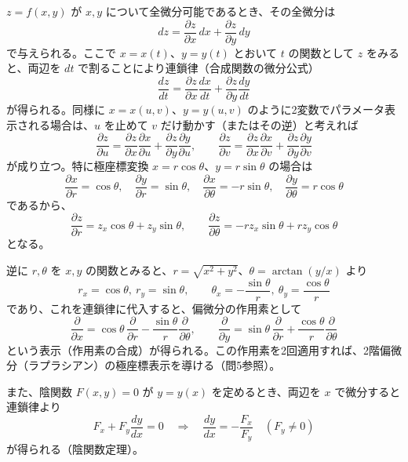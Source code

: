 \documentclass[a4paper,11pt]{article}
\begin{document}


\noindent
$z = f(x,y)$ が $x,y$ について全微分可能であるとき、その全微分は
\[
dz = \frac{\partial z}{\partial x}\,dx + \frac{\partial z}{\partial y}\,dy
\]
で与えられる。ここで $x = x(t)$、$y = y(t)$ とおいて $t$ の関数として $z$ をみると、両辺を $dt$ で割ることにより連鎖律（合成関数の微分公式）
\[
\frac{dz}{dt} = \frac{\partial z}{\partial x}\frac{dx}{dt} + \frac{\partial z}{\partial y}\frac{dy}{dt}
\]
が得られる。同様に $x = x(u,v)$、$y = y(u,v)$ のように2変数でパラメータ表示される場合は、$u$ を止めて $v$ だけ動かす（またはその逆）と考えれば
\[
\frac{\partial z}{\partial u} = \frac{\partial z}{\partial x}\frac{\partial x}{\partial u} + \frac{\partial z}{\partial y}\frac{\partial y}{\partial u}, \qquad
\frac{\partial z}{\partial v} = \frac{\partial z}{\partial x}\frac{\partial x}{\partial v} + \frac{\partial z}{\partial y}\frac{\partial y}{\partial v}
\]
が成り立つ。特に極座標変換 $x = r\cos\theta$、$y = r\sin\theta$ の場合は
\[
\frac{\partial x}{\partial r} = \cos\theta,\quad \frac{\partial y}{\partial r} = \sin\theta,\quad
\frac{\partial x}{\partial \theta} = -r\sin\theta,\quad \frac{\partial y}{\partial \theta} = r\cos\theta
\]
であるから、
\[
\frac{\partial z}{\partial r} = z_{x}\cos\theta + z_{y}\sin\theta, \qquad
\frac{\partial z}{\partial \theta} = -r z_{x}\sin\theta + r z_{y}\cos\theta
\]
となる。

逆に $r,\theta$ を $x,y$ の関数とみると、$r = \sqrt{x^{2}+y^{2}}$、$\theta = \arctan(y/x)$ より
\[
r_{x} = \cos\theta,\ r_{y} = \sin\theta,\qquad
\theta_{x} = -\frac{\sin\theta}{r},\ \theta_{y} = \frac{\cos\theta}{r}
\]
であり、これを連鎖律に代入すると、偏微分の作用素として
\[
\frac{\partial}{\partial x} = \cos\theta\,\frac{\partial}{\partial r} - \frac{\sin\theta}{r}\frac{\partial}{\partial \theta}, \qquad
\frac{\partial}{\partial y} = \sin\theta\,\frac{\partial}{\partial r} + \frac{\cos\theta}{r}\frac{\partial}{\partial \theta}
\]
という表示（作用素の合成）が得られる。この作用素を2回適用すれば、2階偏微分（ラプラシアン）の極座標表示を導ける（問5参照）。

また、陰関数 $F(x,y) = 0$ が $y = y(x)$ を定めるとき、両辺を $x$ で微分すると連鎖律より
\[
F_{x} + F_{y}\frac{dy}{dx} = 0 \quad\Longrightarrow\quad \frac{dy}{dx} = -\frac{F_{x}}{F_{y}} \quad (F_{y} \ne 0)
\]
が得られる（陰関数定理）。
\end{document}
